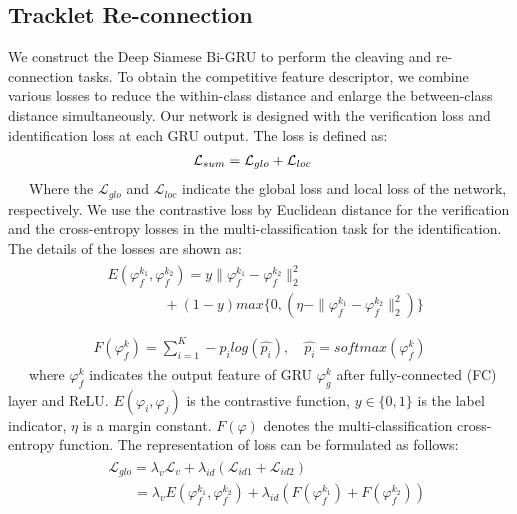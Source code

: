 \documentclass[5pt]{article}
\begin{document}
\subsection{Tracklet Re-connection}
\vspace{-0.2cm}
We construct the Deep Siamese Bi-GRU to perform the cleaving and re-connection tasks. To obtain the competitive feature descriptor, we combine various losses to reduce the within-class distance and enlarge the between-class distance simultaneously. Our network is designed with the verification loss and identification loss at each GRU output. The loss is defined as:
\vspace{-0.1cm}
{\setlength{\abovedisplayskip}{2mm}
\begin{eqnarray}
\vspace{-0.1cm}
&\mathcal{L}_{sum}=\mathcal{L}_{glo}+\mathcal{L}_{loc}
\vspace{-0.2cm}
\end{eqnarray}}
\ \ \ Where the $\mathcal{L}_{glo}$ and $\mathcal{L}_{loc}$ indicate the global loss and local loss of the network, respectively. We use the contrastive loss by Euclidean distance for the verification and the cross-entropy losses in the multi-classification task for the identification. The details of the losses are shown as:
\begin{eqnarray}
\begin{split}
&E(\varphi_f^{k_1},\varphi_f^{k_2})=y\parallel\varphi_f^{k_1}-\varphi_f^{k_2}\parallel_2^2\\
&\qquad\qquad+(1-y)max\{0,(\eta-\parallel\varphi_f^{k_1}-\varphi_f^{k_2}\parallel_2^2)\}\\
\end{split}
\end{eqnarray}
{\setlength{\abovedisplayskip}{-2mm}
\begin{eqnarray}
\begin{split}
F(\varphi_f^k)=\sum_{i=1}^{K}-p_ilog(\hat{p_i}),\quad \hat{p_i}=softmax(\varphi_f^k)
\end{split}
\end{eqnarray}}
\ \ \ where $\varphi_f^k$ indicates the output feature of GRU $\varphi_g^k$ after fully-connected (FC) layer and ReLU. $E(\varphi_i,\varphi_j)$ is the contrastive function, $y\in\{0,1\}$ is the label indicator, $\eta$ is a margin constant. $F(\varphi)$ denotes the multi-classification cross-entropy function. The representation of loss can be formulated as follows:
\begin{eqnarray}
\begin{split}
&\ \mathcal{L}_{glo}=\lambda_v\mathcal{L}_{v}+\lambda_{id}(\mathcal{L}_{id1}+\mathcal{L}_{id2})\\
&\qquad=\lambda_v E(\varphi_f^{k_1},\varphi_f^{k_2})+\lambda_{id}(F(\varphi_f^{k_1})+F(\varphi_f^{k_2}))
\end{split}
\end{eqnarray}
\end{document}
